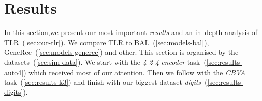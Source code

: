 

\section{Results} 
\label{sec:results} 

In this section,we present our most important \emph{results} and an in--depth analysis of TLR~(\ref{sec:our-tlr}). We compare TLR to BAL~(\ref{sec:models-bal}), GeneRec~(\ref{sec:models-generec}) and other. This section is organised by the datasets~(\ref{sec:sim-data}). We start with the \emph{4-2-4 encoder} task~(\ref{sec:results-auto4}) which received most of our attention. Then we follow with the \emph{CBVA} task~(\ref{sec:results-k3}) and finish with our biggest dataset \emph{digits}~(\ref{sec:results-digits}). 

 

 

 

 

